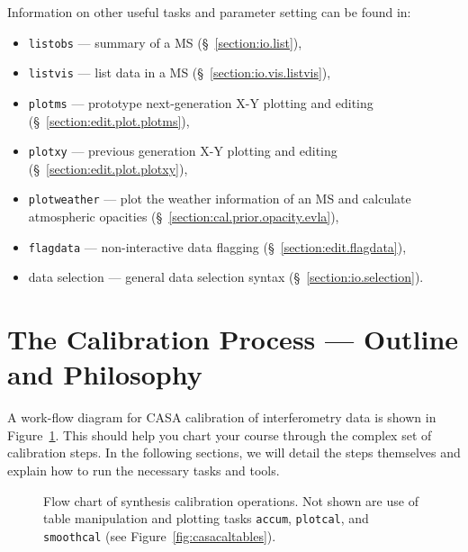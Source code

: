 Information on other useful tasks and parameter setting can be found in:
\begin{itemize}
   \item {\tt listobs} --- summary of a MS (\S~\ref{section:io.list}),
   \item {\tt listvis} --- list data in a MS (\S~\ref{section:io.vis.listvis}),
   \item {\tt plotms} --- prototype next-generation X-Y plotting and editing 
      (\S~\ref{section:edit.plot.plotms}),
   \item {\tt plotxy} --- previous generation X-Y plotting and editing 
      (\S~\ref{section:edit.plot.plotxy}),
    \item {\tt plotweather} --- plot the weather information of an MS
      and calculate atmospheric opacities (\S~\ref{section:cal.prior.opacity.evla}),
   \item {\tt flagdata} --- non-interactive data flagging
      (\S~\ref{section:edit.flagdata}),
   \item data selection --- general data selection syntax
      (\S~\ref{section:io.selection}).
\end{itemize}

\section{The Calibration Process --- Outline and Philosophy}
\label{section:cal.flow}

A work-flow diagram for CASA calibration of interferometry data is
shown in Figure~\ref{fig:casacalflow}.  This should help you chart
your course through the complex set of calibration steps.  In the
following sections, we will detail the steps themselves and explain
how to run the necessary tasks and tools.

\begin{figure}[h!]
\begin{center}
\caption{\label{fig:casacalflow}
Flow chart of synthesis calibration operations. Not shown are
use of table manipulation and plotting tasks {\tt accum}, 
{\tt plotcal}, and {\tt smoothcal} 
(see Figure~\ref{fig:casacaltables}).  }
\hrulefill
\end{center}
\end{figure}

